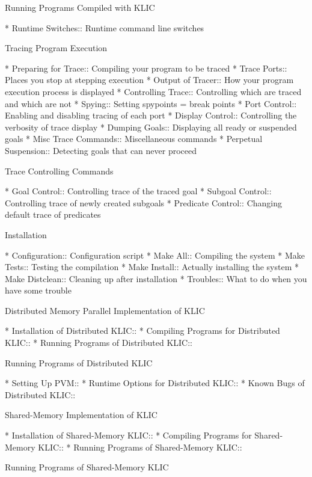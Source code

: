 Running Programs Compiled with KLIC

* Runtime Switches::            Runtime command line switches

Tracing Program Execution

* Preparing for Trace::         Compiling your program to be traced
* Trace Ports::                 Places you stop at stepping execution
* Output of Tracer::            How your program execution process is displayed
* Controlling Trace::           Controlling which are traced and which are not
* Spying::                      Setting spypoints = break points
* Port Control::                Enabling and disabling tracing of each port
* Display Control::             Controlling the verbosity of trace display
* Dumping Goals::               Displaying all ready or suspended goals
* Misc Trace Commands::         Miscellaneous commands
* Perpetual Suspension::        Detecting goals that can never proceed

Trace Controlling Commands

* Goal Control::                Controlling trace of the traced goal
* Subgoal Control::             Controlling trace of newly created subgoals
* Predicate Control::           Changing default trace of predicates

Installation

* Configuration::               Configuration script
* Make All::                    Compiling the system
* Make Tests::                  Testing the compilation
* Make Install::                Actually installing the system
* Make Distclean::              Cleaning up after installation
* Troubles::                    What to do when you have some trouble

Distributed Memory Parallel Implementation of KLIC

* Installation of Distributed KLIC::  
* Compiling Programs for Distributed KLIC::  
* Running Programs of Distributed KLIC::  

Running Programs of Distributed KLIC

* Setting Up PVM::              
* Runtime Options for Distributed KLIC::  
* Known Bugs of Distributed KLIC::  

Shared-Memory Implementation of KLIC 

* Installation of Shared-Memory KLIC::  
* Compiling Programs for Shared-Memory KLIC::  
* Running Programs of Shared-Memory KLIC::  

Running Programs of Shared-Memory KLIC

